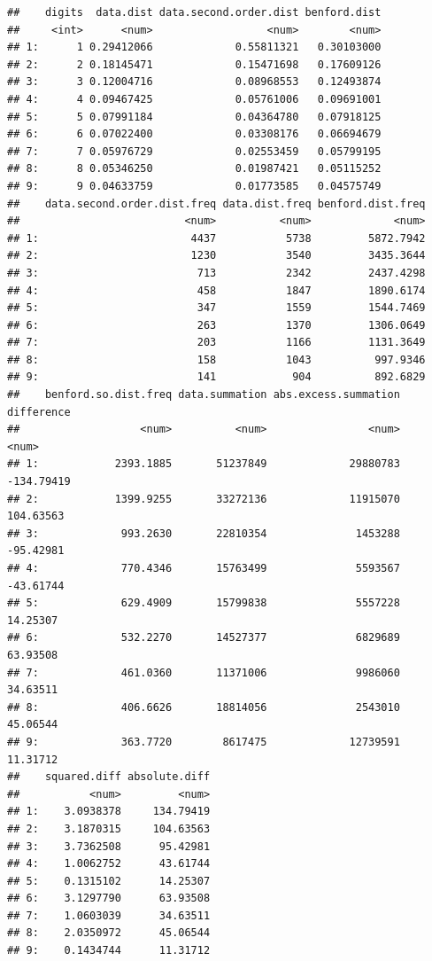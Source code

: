 \documentclass[
]{book}
\begin{document}
\begin{verbatim}
##    digits  data.dist data.second.order.dist benford.dist
##     <int>      <num>                  <num>        <num>
## 1:      1 0.29412066             0.55811321   0.30103000
## 2:      2 0.18145471             0.15471698   0.17609126
## 3:      3 0.12004716             0.08968553   0.12493874
## 4:      4 0.09467425             0.05761006   0.09691001
## 5:      5 0.07991184             0.04364780   0.07918125
## 6:      6 0.07022400             0.03308176   0.06694679
## 7:      7 0.05976729             0.02553459   0.05799195
## 8:      8 0.05346250             0.01987421   0.05115252
## 9:      9 0.04633759             0.01773585   0.04575749
##    data.second.order.dist.freq data.dist.freq benford.dist.freq
##                          <num>          <num>             <num>
## 1:                        4437           5738         5872.7942
## 2:                        1230           3540         3435.3644
## 3:                         713           2342         2437.4298
## 4:                         458           1847         1890.6174
## 5:                         347           1559         1544.7469
## 6:                         263           1370         1306.0649
## 7:                         203           1166         1131.3649
## 8:                         158           1043          997.9346
## 9:                         141            904          892.6829
##    benford.so.dist.freq data.summation abs.excess.summation difference
##                   <num>          <num>                <num>      <num>
## 1:            2393.1885       51237849             29880783 -134.79419
## 2:            1399.9255       33272136             11915070  104.63563
## 3:             993.2630       22810354              1453288  -95.42981
## 4:             770.4346       15763499              5593567  -43.61744
## 5:             629.4909       15799838              5557228   14.25307
## 6:             532.2270       14527377              6829689   63.93508
## 7:             461.0360       11371006              9986060   34.63511
## 8:             406.6626       18814056              2543010   45.06544
## 9:             363.7720        8617475             12739591   11.31712
##    squared.diff absolute.diff
##           <num>         <num>
## 1:    3.0938378     134.79419
## 2:    3.1870315     104.63563
## 3:    3.7362508      95.42981
## 4:    1.0062752      43.61744
## 5:    0.1315102      14.25307
## 6:    3.1297790      63.93508
## 7:    1.0603039      34.63511
## 8:    2.0350972      45.06544
## 9:    0.1434744      11.31712
\end{verbatim}
\end{document}
